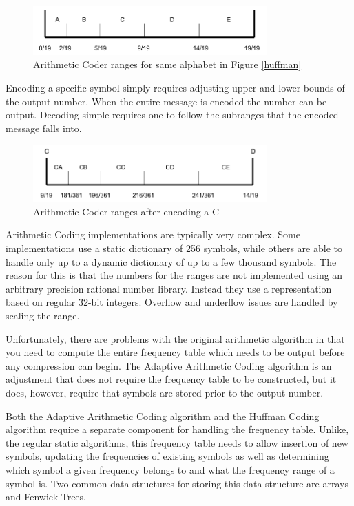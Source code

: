 \documentclass[a4paper,11pt]{report}
\begin{document}
\begin{figure}
 \center
 \includegraphics[width=0.8\textwidth]{resources/ArithmeticCoder.png}
\caption{Arithmetic Coder ranges for same alphabet in Figure \ref{huffman}}
\label{arithmeticcoder}
\end{figure}

Encoding a specific symbol simply requires adjusting upper and lower bounds of the output number. When the entire message is encoded the number can be output. Decoding simple requires one to follow the subranges that the encoded message falls into.

\begin{figure}[h]
 \center
 \includegraphics[width=0.8\textwidth]{resources/ArithmeticCoderSubrange.png}
\caption{Arithmetic Coder ranges after encoding a C}
\label{arithmeticcodersubrange}
\end{figure}

Arithmetic Coding implementations are typically very complex. Some implementations use a static dictionary of 256 symbols, while others are able to handle only up to a dynamic dictionary of up to a few thousand symbols. The reason for this is that the numbers for the ranges are not implemented using an arbitrary precision rational number library. Instead they use a representation based on regular 32-bit integers. Overflow and underflow issues are handled by scaling the range.

Unfortunately, there are problems with the original arithmetic algorithm in that you need to compute the entire frequency table which needs to be output before any compression can begin. The Adaptive Arithmetic Coding algorithm is an adjustment that does not require the frequency table to be constructed, but it does, however, require that symbols are stored prior to the output number. 

Both the Adaptive Arithmetic Coding algorithm and the Huffman Coding algorithm require a separate component for handling the frequency table. Unlike, the regular static algorithms, this frequency table needs to allow insertion of new symbols, updating the frequencies of existing symbols as well as determining which symbol a given frequency belongs to and what the frequency range of a symbol is. Two common data structures for storing this data structure are arrays and Fenwick Trees.
\end{document}
